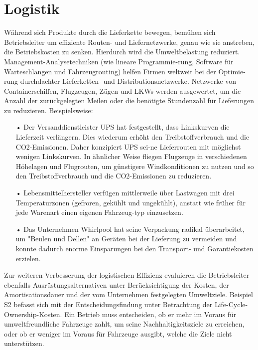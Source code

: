 \documentclass[13pt,titlepage]{article}
\begin{document}
\section*{Logistik}
Während sich Produkte durch die Lieferkette bewegen, bemühen sich Betriebsleiter um effiziente Routen- und Liefernetzwerke, genau wie sie anstreben, die Betriebskosten zu senken. Hierdurch wird die Umweltbelastung reduziert. Management-Analysetechniken (wie lineare Programmie-rung, Software für Warteschlangen und Fahrzeugrouting) helfen Firmen weltweit bei der Optimie-rung durchdachter Lieferketten- und Distributionsnetzwerke. Netzwerke von Containerschiffen, Flugzeugen, Zügen und LKWs werden ausgewertet, um die Anzahl der zurückgelegten Meilen oder die benötigte Stundenzahl für Lieferungen zu reduzieren. Beispielsweise:
\begin{itemize}
\item[•] Der Versanddienstleister UPS hat festgestellt, dass Linkskurven die Lieferzeit verlängern. Dies wiederum erhöht den Treibstoffverbrauch und die CO2-Emissionen. Daher konzipiert UPS sei-ne Lieferrouten mit möglichst wenigen Linkskurven. In ähnlicher Weise fliegen Flugzeuge in verschiedenen Höhelagen und Flugrouten, um günstigere Windkonditionen zu nutzen und so den Treibstoffverbrauch und die CO2-Emissionen zu reduzieren.
\item[•] Lebensmittelhersteller verfügen mittlerweile über Lastwagen mit drei Temperaturzonen (gefroren, gekühlt und ungekühlt), anstatt wie früher für jede Warenart einen eigenen Fahrzeug-typ einzusetzen.
\item[•] Das Unternehmen Whirlpool hat seine Verpackung radikal überarbeitet, um "Beulen und Dellen" an Geräten bei der Lieferung zu vermeiden und konnte dadurch enorme Einsparungen bei den Transport- und Garantiekosten erzielen.
\end{itemize}

\noindent Zur weiteren Verbesserung der logistischen Effizienz evaluieren die Betriebsleiter ebenfalls Ausrüstungsalternativen unter Berücksichtigung der Kosten, der Amortisationsdauer und der vom Unternehmen festgelegten Umweltziele. Beispiel S2 befasst sich mit der Entscheidungsfindung unter Betrachtung der Life-Cycle-Ownership-Kosten. Ein Betrieb muss entscheiden, ob er mehr im Voraus für umweltfreundliche Fahrzeuge zahlt, um seine Nachhaltigkeitsziele zu erreichen, oder ob er weniger im Voraus für Fahrzeuge ausgibt, welche die Ziele nicht unterstützen.
\end{document}
